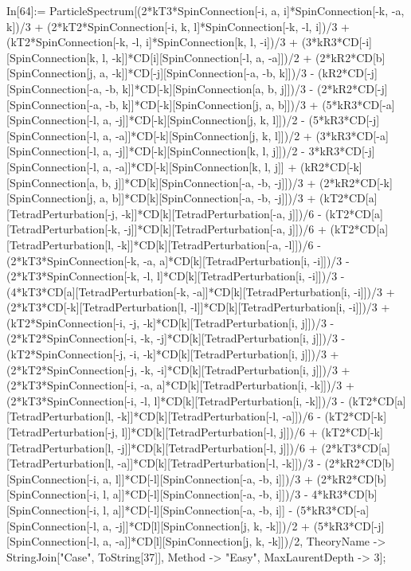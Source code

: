 In[64]:= ParticleSpectrum[(2*kT3*SpinConnection[-i, a, i]*SpinConnection[-k, -a, k])/3 + (2*kT2*SpinConnection[-i, k, l]*SpinConnection[-k, -l, i])/3 + (kT2*SpinConnection[-k, -l, i]*SpinConnection[k, l, -i])/3 + (3*kR3*CD[-i][SpinConnection[k, l, -k]]*CD[i][SpinConnection[-l, a, -a]])/2 + (2*kR2*CD[b][SpinConnection[j, a, -k]]*CD[-j][SpinConnection[-a, -b, k]])/3 - (kR2*CD[-j][SpinConnection[-a, -b, k]]*CD[-k][SpinConnection[a, b, j]])/3 - (2*kR2*CD[-j][SpinConnection[-a, -b, k]]*CD[-k][SpinConnection[j, a, b]])/3 + (5*kR3*CD[-a][SpinConnection[-l, a, -j]]*CD[-k][SpinConnection[j, k, l]])/2 - (5*kR3*CD[-j][SpinConnection[-l, a, -a]]*CD[-k][SpinConnection[j, k, l]])/2 + (3*kR3*CD[-a][SpinConnection[-l, a, -j]]*CD[-k][SpinConnection[k, l, j]])/2 - 3*kR3*CD[-j][SpinConnection[-l, a, -a]]*CD[-k][SpinConnection[k, l, j]] + (kR2*CD[-k][SpinConnection[a, b, j]]*CD[k][SpinConnection[-a, -b, -j]])/3 + (2*kR2*CD[-k][SpinConnection[j, a, b]]*CD[k][SpinConnection[-a, -b, -j]])/3 + (kT2*CD[a][TetradPerturbation[-j, -k]]*CD[k][TetradPerturbation[-a, j]])/6 - (kT2*CD[a][TetradPerturbation[-k, -j]]*CD[k][TetradPerturbation[-a, j]])/6 + (kT2*CD[a][TetradPerturbation[l, -k]]*CD[k][TetradPerturbation[-a, -l]])/6 - (2*kT3*SpinConnection[-k, -a, a]*CD[k][TetradPerturbation[i, -i]])/3 - (2*kT3*SpinConnection[-k, -l, l]*CD[k][TetradPerturbation[i, -i]])/3 - (4*kT3*CD[a][TetradPerturbation[-k, -a]]*CD[k][TetradPerturbation[i, -i]])/3 + (2*kT3*CD[-k][TetradPerturbation[l, -l]]*CD[k][TetradPerturbation[i, -i]])/3 + (kT2*SpinConnection[-i, -j, -k]*CD[k][TetradPerturbation[i, j]])/3 - (2*kT2*SpinConnection[-i, -k, -j]*CD[k][TetradPerturbation[i, j]])/3 - (kT2*SpinConnection[-j, -i, -k]*CD[k][TetradPerturbation[i, j]])/3 + (2*kT2*SpinConnection[-j, -k, -i]*CD[k][TetradPerturbation[i, j]])/3 + (2*kT3*SpinConnection[-i, -a, a]*CD[k][TetradPerturbation[i, -k]])/3 + (2*kT3*SpinConnection[-i, -l, l]*CD[k][TetradPerturbation[i, -k]])/3 - (kT2*CD[a][TetradPerturbation[l, -k]]*CD[k][TetradPerturbation[-l, -a]])/6 - (kT2*CD[-k][TetradPerturbation[-j, l]]*CD[k][TetradPerturbation[-l, j]])/6 + (kT2*CD[-k][TetradPerturbation[l, -j]]*CD[k][TetradPerturbation[-l, j]])/6 + (2*kT3*CD[a][TetradPerturbation[l, -a]]*CD[k][TetradPerturbation[-l, -k]])/3 - (2*kR2*CD[b][SpinConnection[-i, a, l]]*CD[-l][SpinConnection[-a, -b, i]])/3 + (2*kR2*CD[b][SpinConnection[-i, l, a]]*CD[-l][SpinConnection[-a, -b, i]])/3 - 4*kR3*CD[b][SpinConnection[-i, l, a]]*CD[-l][SpinConnection[-a, -b, i]] - (5*kR3*CD[-a][SpinConnection[-l, a, -j]]*CD[l][SpinConnection[j, k, -k]])/2 + (5*kR3*CD[-j][SpinConnection[-l, a, -a]]*CD[l][SpinConnection[j, k, -k]])/2, TheoryName -> StringJoin["Case", ToString[37]], Method -> "Easy", MaxLaurentDepth -> 3]; 